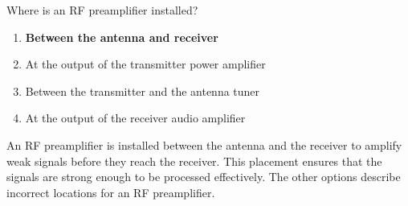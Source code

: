 \begin{tcolorbox}[colback=gray!10!white,colframe=black!75!black,title={T7A11}]
    Where is an RF preamplifier installed?
    \begin{enumerate}[label=\Alph*),noitemsep]
        \item \textbf{Between the antenna and receiver}
        \item At the output of the transmitter power amplifier
        \item Between the transmitter and the antenna tuner
        \item At the output of the receiver audio amplifier
    \end{enumerate}
\end{tcolorbox}

An RF preamplifier is installed between the antenna and the receiver to amplify weak signals before they reach the receiver. This placement ensures that the signals are strong enough to be processed effectively. The other options describe incorrect locations for an RF preamplifier.

